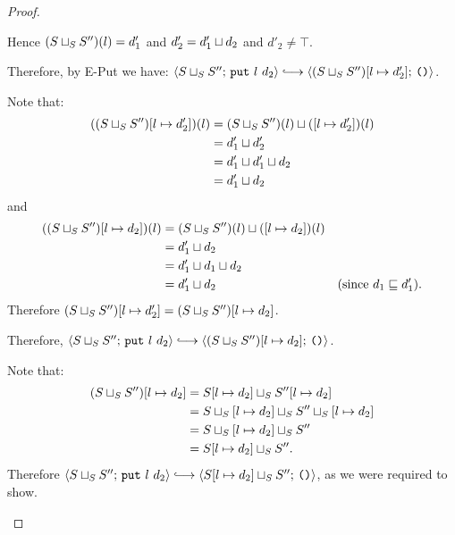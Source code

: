 \begin{proof}
\begin{itemize}
\begin{itemize}
          Hence $(S \sqcup_{S} S'')(l) = d'_1$ and $d'_2 =
          d'_1 \sqcup d_2$ and $d'_2 \neq \top$.

          Therefore, by {\sc E-Put} we have:
          $\config{\lubstore{S}{S''}}{\putexp{l}{d_2}} \parstepsto
          \config{\extSRaw{(\lubstore{S}{S''})}{l}{d'_2}}{\unit}$.


          Note that:
          \begin{align*}
            ((S \sqcup_{S} S'')[l \mapsto d'_2])(l) &=
            (S \sqcup_{S} S'')(l) \sqcup (\left[ l \mapsto d'_2 \right])(l)
            \\ &= d'_1 \sqcup d'_2 \\ &=
            d'_1 \sqcup d'_1 \sqcup d_2 \\ &=
            d'_1 \sqcup d_2
          \end{align*}
          and
          \begin{align*}
            ((S \sqcup_{S} S'')[l \mapsto d_2])(l) &=
            (S \sqcup_{S} S'')(l) \sqcup (\left[ l \mapsto d_2 \right])(l)
            \\ &= d'_1 \sqcup d_2 \\ &=
            d'_1 \sqcup d_1 \sqcup d_2 \\ &=
            d'_1 \sqcup d_2 & \textrm{(since $d_1 \sqsubseteq
              d'_1$).}
          \end{align*}
          Therefore $(S \sqcup_{S} S'')[l \mapsto d'_2] =
          (S \sqcup_{S} S'')[l \mapsto d_2]$.

          Therefore, $\config{\lubstore{S}{S''}}{\putexp{l}{d_2}}
          \parstepsto
          \config{\extSRaw{(\lubstore{S}{S''})}{l}{d_2}}{\unit}$.
      \end{itemize}

      Note that:
      \begin{align*}
        (S \sqcup_{S} S'')[l \mapsto d_2] &=
        S[l \mapsto d_2] \sqcup_{S} S''[l \mapsto d_2] \\ &=
        S \sqcup_{S} \left[ l \mapsto d_2 \right] \sqcup_{S} S'' \sqcup_{S} \left[ l \mapsto d_2 \right]
        \\ &=
        S \sqcup_{S} \left[ l \mapsto d_2 \right] \sqcup_{S} S''
        \\ &= S[l \mapsto d_2] \sqcup_{S} S''.
      \end{align*}
      Therefore $\config{\lubstore{S}{S''}}{\putexp{l}{d_2}}
      \parstepsto
      \config{\lubstore{\extSRaw{S}{l}{d_2}}{S''}}{\unit}$, as we were
      required to show.


\end{itemize}
\end{proof}
